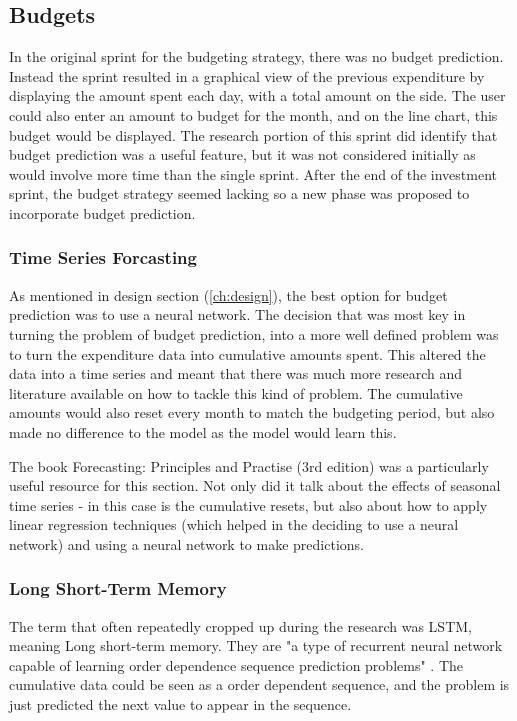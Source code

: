 \subsection{Budgets}
In the original sprint for the budgeting strategy, there was no budget prediction. Instead the sprint resulted in a graphical view of the previous expenditure by displaying the amount spent each day, with a total amount on the side. The user could also enter an amount to budget for the month, and on the line chart, this budget would be displayed. The research portion of this sprint did identify that budget prediction was a useful feature, but it was not considered initially as would involve more time than the single sprint. After the end of the investment sprint, the budget strategy seemed lacking so a new phase was proposed to incorporate budget prediction.

\subsubsection{Time Series Forcasting}
As mentioned in design section (\ref{ch:design}), the best option for budget prediction was to use a neural network. The decision that was most key in turning the problem of budget prediction, into a more well defined problem was to turn the expenditure data into cumulative amounts spent. This altered the data into a time series and meant that there was much more research and literature available on how to tackle this kind of problem. The cumulative amounts would also reset every month to match the budgeting period, but also made no difference to the model as the model would learn this.

The book Forecasting: Principles and Practise (3rd edition) \cite{ForcastingPrinciplesPractise} was a particularly useful resource for this section. Not only did it talk about the effects of seasonal time series - in this case is the cumulative resets, but also about how to apply linear regression techniques (which helped in the deciding to use a neural network) and using a neural network to make predictions.

\subsubsection{Long Short-Term Memory}
The term that often repeatedly cropped up during the research was LSTM, meaning Long short-term memory. They are "a type of recurrent neural network capable of learning order dependence sequence prediction problems" \cite{LSTMGentleIntro}. The cumulative data could be seen as a order dependent sequence, and the problem is just predicted the next value to appear in the sequence. 

